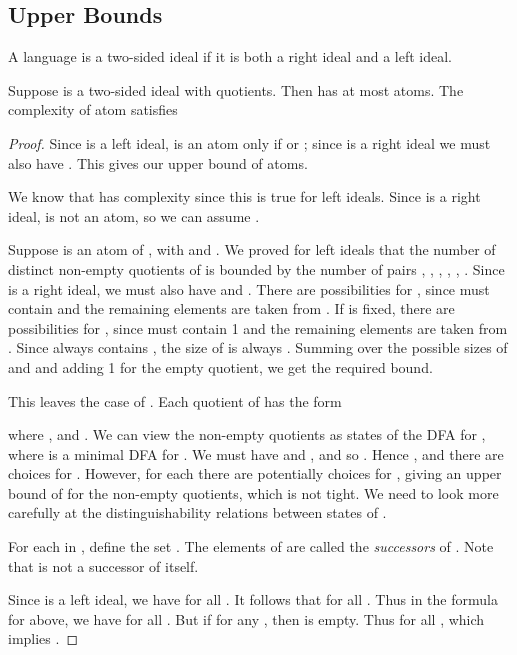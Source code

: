 \documentclass{llncs}
\begin{document}
\subsection{Upper Bounds}
A language  is a two-sided ideal if it is both a right  ideal  and a left ideal.


\label{sec:2sided_bounds}
\begin{proposition}
\label{prop:bounds_2sided}
Suppose  is a two-sided ideal with  quotients. Then  has at most  atoms. The  complexity  of atom  satisfies




\end{proposition}
\begin{proof}
Since  is a left ideal,  is an atom only if  or ; since  is a right ideal we must also have .
This gives our upper bound of  atoms.

We know that  has complexity  since this is true for left ideals.
Since  is a right ideal,  is not an atom, so we can assume .



Suppose  is an atom of , with  and .
We proved for left ideals that the number of distinct non-empty quotients of  is bounded by the number of pairs , , , , , .
Since  is a right ideal, we must also have  and . 
There are  possibilities for , since  must contain  and the remaining  elements are taken from .
If  is fixed, there are  possibilities for , since  must contain 1 and the remaining  elements are taken from . Since  always contains ,  the size of  is always .
Summing over the possible sizes of  and  and adding 1 for the empty quotient, we get the required bound.

This  leaves the case of .
Each quotient of  has the form

where , and . We can view the non-empty quotients as states  of the DFA  for , where  is a minimal DFA for .
We must have  and ,  and so . Hence , and there are  choices for .
However, for each  there are potentially  choices for , giving an upper bound of  for the non-empty quotients, which is not tight. We need to look more carefully at the distinguishability relations between states of .

For each  in , define the set . The elements of  are called the \emph{successors} of .
Note that  is not  a successor of itself.

Since  is a left ideal, we have  for all .
It follows that  for all .
Thus in the formula for  above, we have  for all .
But if  for any , then  is empty. 
Thus  for all , which implies .


\end{proof}
\end{document}
